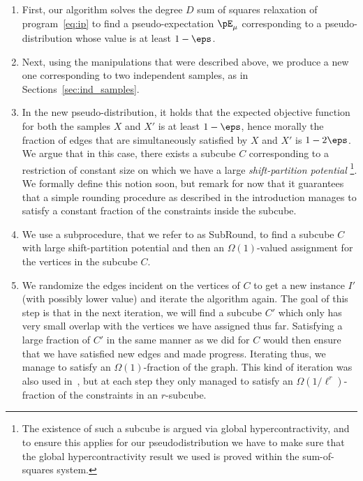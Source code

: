 \begin{enumerate}
    \item First, our algorithm solves the degree $D$ sum of squares relaxation of program~\eqref{eq:ip} to find a pseudo-expectation $\pE_{\mu}$ corresponding to a pseudo-distribution 
    whose value is at least $1-\eps$.
    \item Next, using the manipulations that were described above, we produce a new one corresponding to two independent samples, 
    as in Sections~\ref{sec:ind_samples}.
    \item In the new pseudo-distribution, it holds that the expected objective function for both the samples $X$ and $X'$ is at least $1-\eps$, hence morally the fraction of edges that are simultaneously satisfied by $X$ and $X'$ is $1-2\eps$. We argue that in this case, there exists a subcube $C$ corresponding to a restriction of constant size on 
    which we have a large \emph{shift-partition potential} \footnote{The existence 
    of such a subcube is argued via global hypercontractivity,
    and to ensure this applies for our pseudodistribution 
    we have to make sure that the global hypercontractivity 
    result we used is proved within the sum-of-squares 
    system.}. We formally define this notion soon, but remark for now that it guarantees that a simple rounding procedure as described in the introduction manages to satisfy a constant fraction of the constraints inside the subcube.
    \item We use a subprocedure, that we refer to as SubRound, to find a subcube $C$ with large shift-partition potential and then an $\Omega(1)$-valued assignment for the vertices in the subcube $C$.
    \item We randomize the edges incident on the vertices of $C$ to get a new instance $I'$ (with possibly lower value) 
    and iterate the algorithm again. The goal of this step is 
    that in the next iteration, we will find a subcube $C'$ 
    which only has very small overlap with the vertices we have assigned thus far. Satisfying a large fraction of $C'$ in the same manner as we did for $C$ would then ensure that we have satisfied new edges and made progress. Iterating thus, we manage to satisfy an $\Omega(1)$-fraction of the graph. This kind of iteration was also used in~\cite{BBKSS}, but at each step they only managed to satisfy an $\Omega(1/\ell^r)$-fraction of the constraints in an $r$-subcube.
\end{enumerate}

